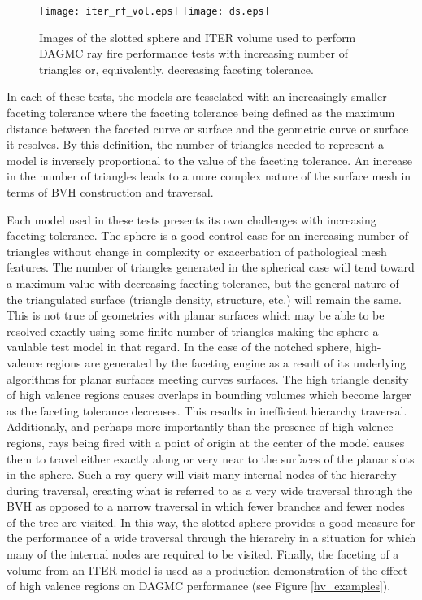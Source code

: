 \begin{figure}[H]
    \texttt{[image: iter\_rf\_vol.eps]}
    \texttt{[image: ds.eps]}
\begin{center}
  \caption{Images of the slotted sphere and ITER volume used to perform DAGMC
    ray fire performance tests with increasing number of triangles or,
    equivalently, decreasing faceting tolerance.}
\end{center}
\label{fig:sj_hv_test_models}
\end{figure} 

In each of these tests, the models are tesselated with an increasingly smaller
faceting tolerance where the faceting tolerance being defined as the maximum
distance between the faceted curve or surface and the geometric curve or surface
it resolves.  By this definition, the number of triangles needed to represent a
model is inversely proportional to the value of the faceting tolerance. An
increase in the number of triangles leads to a more complex nature of the
surface mesh in terms of BVH construction and traversal.

Each model used in these tests presents its own challenges with increasing
faceting tolerance. The sphere is a good control case for an increasing number
of triangles without change in complexity or exacerbation of pathological mesh
features. The number of triangles generated in the spherical case will tend
toward a maximum value with decreasing faceting tolerance, but the general
nature of the triangulated surface (triangle density, structure, etc.)  will
remain the same. This is not true of geometries with planar surfaces which may
be able to be resolved exactly using some finite number of triangles making the
sphere a vaulable test model in that regard. In the case of the notched sphere,
high-valence regions are generated by the faceting engine as a result of its
underlying algorithms for planar surfaces meeting curves surfaces. The high
triangle density of high valence regions causes overlaps in bounding volumes
which become larger as the faceting tolerance decreases. This results in
inefficient hierarchy traversal. Additionaly, and perhaps more importantly than
the presence of high valence regions, rays being fired with a point of origin at
the center of the model causes them to travel either exactly along or very near
to the surfaces of the planar slots in the sphere. Such a ray query will visit
many internal nodes of the hierarchy during traversal, creating what is referred
to as a very wide traversal through the BVH as opposed to a narrow traversal in
which fewer branches and fewer nodes of the tree are visited. In this way, the
slotted sphere provides a good measure for the performance of a wide traversal
through the hierarchy in a situation for which many of the internal nodes are
required to be visited. Finally, the faceting of a volume from an ITER model is
used as a production demonstration of the effect of high valence regions on
DAGMC performance (see Figure \ref{hv_examples}).

